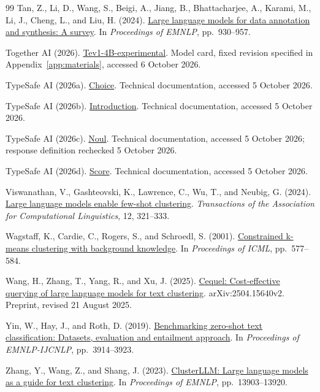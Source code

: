 \documentclass[UTF8,a4paper,zihao=-4,fontset=fandol]{ctexart}
\begin{document}
\begin{thebibliography}{99}
Tan, Z., Li, D., Wang, S., Beigi, A., Jiang, B., Bhattacharjee, A., Karami, M., Li, J., Cheng, L., and Liu, H. (2024).
\href{https://doi.org/10.18653/v1/2024.emnlp-main.54}{Large language models for data annotation and synthesis: A survey}.
In \emph{Proceedings of EMNLP}, pp.~930--957.

Together AI (2026).
\href{https://huggingface.co/togethercomputer/Tev1-4B-experimental/tree/0b7becf017daa0e5eb222f8ce7483c8c8259c52f}{Tev1-4B-experimental}.
Model card, fixed revision specified in Appendix~\ref{app:materials}, accessed 6 October 2026.

TypeSafe AI (2026a).
\href{https://docs.typesafe.ai/primitives/choice}{Choice}.
Technical documentation, accessed 5 October 2026.

TypeSafe AI (2026b).
\href{https://docs.typesafe.ai/introduction}{Introduction}.
Technical documentation, accessed 5 October 2026.

TypeSafe AI (2026c).
\href{https://docs.typesafe.ai/primitives/noul}{Noul}.
Technical documentation, accessed 5 October 2026; response definition rechecked 5 October 2026.

TypeSafe AI (2026d).
\href{https://docs.typesafe.ai/primitives/score}{Score}.
Technical documentation, accessed 5 October 2026.

Viswanathan, V., Gashteovski, K., Lawrence, C., Wu, T., and Neubig, G. (2024).
\href{https://doi.org/10.1162/tacl_a_00648}{Large language models enable few-shot clustering}.
\emph{Transactions of the Association for Computational Linguistics}, 12, 321--333.

Wagstaff, K., Cardie, C., Rogers, S., and Schroedl, S. (2001).
\href{https://www.cs.cmu.edu/~dgovinda/pdf/icml-2001.pdf}{Constrained k-means clustering with background knowledge}.
In \emph{Proceedings of ICML}, pp.~577--584.

Wang, H., Zhang, T., Yang, R., and Xu, J. (2025).
\href{https://arxiv.org/abs/2504.15640v2}{Cequel: Cost-effective querying of large language models for text clustering}.
arXiv:2504.15640v2. Preprint, revised 21 August 2025.

Yin, W., Hay, J., and Roth, D. (2019).
\href{https://doi.org/10.18653/v1/D19-1404}{Benchmarking zero-shot text classification: Datasets, evaluation and entailment approach}.
In \emph{Proceedings of EMNLP-IJCNLP}, pp.~3914--3923.

Zhang, Y., Wang, Z., and Shang, J. (2023).
\href{https://doi.org/10.18653/v1/2023.emnlp-main.858}{ClusterLLM: Large language models as a guide for text clustering}.
In \emph{Proceedings of EMNLP}, pp.~13903--13920.

\end{thebibliography}
\end{document}
